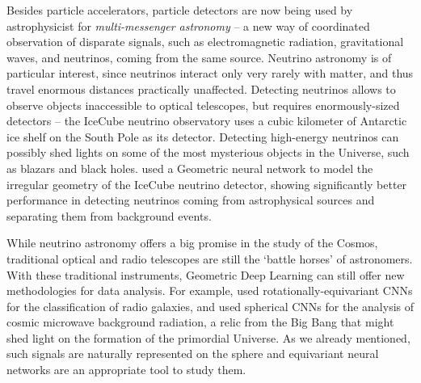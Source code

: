 Besides particle accelerators,
 particle detectors are now being used by astrophysicist for {\em multi-messenger astronomy} --  a new way of coordinated observation of disparate signals, such as electromagnetic radiation, gravitational waves, and neutrinos, coming from the same source. 
%
Neutrino astronomy is of particular interest, since neutrinos interact only very rarely with matter, and thus travel enormous distances practically unaffected. Detecting neutrinos allows to observe objects inaccessible to optical telescopes, but requires enormously-sized detectors -- the IceCube neutrino observatory uses a cubic kilometer of Antarctic ice shelf on the South Pole as its detector. 
%
Detecting high-energy neutrinos can possibly shed lights on some of the most mysterious objects in the Universe, such as blazars and black holes. 
%
\cite{choma2018graph} used a Geometric neural network to model the irregular geometry of the IceCube neutrino detector, showing significantly better performance in detecting neutrinos coming from astrophysical sources and separating them from background events. 


While neutrino astronomy offers a big promise in the study of the Cosmos, traditional optical and radio telescopes are still the `battle horses' of astronomers. 
%
With these traditional instruments, Geometric Deep Learning can still offer new methodologies for data analysis. For example, \cite{scaife2021fanaroff} used rotationally-equivariant CNNs for the classification of radio galaxies, and \cite{mcewen2021scattering} used 
spherical CNNs for the analysis of cosmic microwave background radiation, a relic from the Big Bang that might shed light on the formation of the primordial Universe. As we already mentioned, such signals are naturally represented on the sphere and equivariant neural networks are an appropriate tool to study them. 


